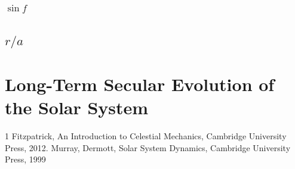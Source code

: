 \documentclass [12pt, a4paper] {article}
\begin{document}
\subsubsection{$\sin f$}
\subsection{$r/a$}

\section{Long-Term Secular Evolution of the Solar System}
\lstset{inputencoding=utf8}
\begin {footnotesize}

\end {footnotesize}
\newpage

\begin {thebibliography}{1}
    Fitzpatrick, An Introduction to Celestial Mechanics, 
    Cambridge University Press, 2012.
    Murray, Dermott, Solar System Dynamics,
    Cambridge University Press, 1999
\end {thebibliography}
\end{document}
